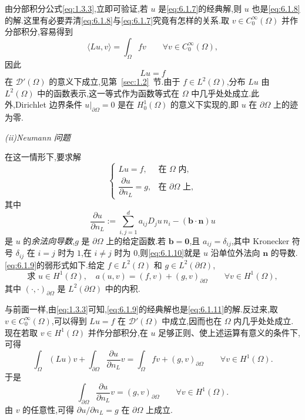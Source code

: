 由分部积分公式\eqref{eq:1.3.3},立即可验证,若 \(u\) 是\eqref{eq:6.1.7}的经典解,则 \(u\) 也是\eqref{eq:6.1.8}的解.这里有必要弄清\eqref{eq:6.1.8}与\eqref{eq:6.1.7}究竟有怎样的关系.取 \(v\in C_0^\infty(\Omega)\) 并作分部积分,容易得到
\[
  \langle Lu,v\rangle=\int_\Omega fv\qquad\forall v\in C_0^\infty(\Omega),
\]
因此
\[
  Lu=f
\]
在 \(\mathcal D'(\Omega)\) 的意义下成立,见第~\ref{sec:1.2}~节.由于 \(f\in L^2(\Omega)\),分布 \(Lu\) 由 \(L^2(\Omega)\) 中的函数表示,这一等式作为函数等式在 \(\Omega\) 中几乎处处成立.此外,Dirichlet 边界条件 \(u|_{\partial\Omega}=0\) 是在 \(H_0^1(\Omega)\) 的意义下实现的,即 \(u\) 在 \(\partial\Omega\) 上的迹为零.

\medskip
\noindent\textit{(ii)Neumann 问题}

在这一情形下,要求解
\begin{equation}\label{eq:6.1.9}
  \begin{cases}
    Lu=f,&\text{在 }\Omega\text{ 内},\\
    \dfrac{\partial u}{\partial n_L}=g,&\text{在 }\partial\Omega\text{ 上},
  \end{cases}
\end{equation}
其中
\begin{equation}\label{eq:6.1.10}
  \frac{\partial u}{\partial n_L}
  :=\sum_{i,j=1}^d a_{ij}D_ju\,n_i-(\boldsymbol{b}\cdot\boldsymbol{n})u
\end{equation}
是 \(u\) 的\emph{余法向导数},\(g\) 是 \(\partial\Omega\) 上的给定函数.若 \(\boldsymbol{b}=\boldsymbol{0}\),且 \(a_{ij}=\delta_{ij}\),其中 Kronecker 符号 \(\delta_{ij}\) 在 \(i=j\) 时为 \(1\),在 \(i\ne j\) 时为 \(0\),则\eqref{eq:6.1.10}就是 \(u\) 沿单位外法向 \(\boldsymbol{n}\) 的导数.\eqref{eq:6.1.9}的弱形式如下.给定 \(f\in L^2(\Omega)\) 和 \(g\in L^2(\partial\Omega)\),
\begin{equation}\label{eq:6.1.11}
  \text{求 }u\in H^1(\Omega),\quad
  a(u,v)=(f,v)+(g,v)_{\partial\Omega}
    \qquad\forall v\in H^1(\Omega),
\end{equation}
其中 \((\cdot,\cdot)_{\partial\Omega}\) 是 \(L^2(\partial\Omega)\) 中的内积.

与前面一样,由\eqref{eq:1.3.3}可知,\eqref{eq:6.1.9}的经典解也是\eqref{eq:6.1.11}的解.反过来,取 \(v\in C_0^\infty(\Omega)\),可以得到 \(Lu=f\) 在 \(\mathcal D'(\Omega)\) 中成立,因而也在 \(\Omega\) 内几乎处处成立.现在若取 \(v\in H^1(\Omega)\) 并作分部积分,在 \(u\) 足够正则、使上述运算有意义的条件下,可得
\[
  \int_\Omega (Lu)v+\int_{\partial\Omega}\frac{\partial u}{\partial n_L}v
    =\int_\Omega fv+(g,v)_{\partial\Omega}\qquad\forall v\in H^1(\Omega).
\]
于是
\begin{equation}\label{eq:6.1.12}
  \int_{\partial\Omega}\frac{\partial u}{\partial n_L}v
    =(g,v)_{\partial\Omega}\qquad\forall v\in H^1(\Omega).
\end{equation}
由 \(v\) 的任意性,可得 \(\partial u/\partial n_L=g\) 在 \(\partial\Omega\) 上成立.

